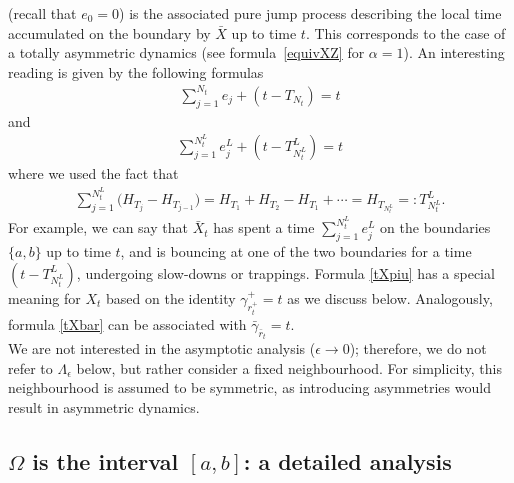 \documentclass[10pt,a4paper]{article}
\numberwithin{equation}{section}
\theoremstyle{plain}
\theoremstyle{remark}
\begin{document}
(recall that $e_0=0$) is the associated pure jump process describing the local time accumulated on the boundary by $\bar{X}$ up to time $t$. This corresponds to the case of a totally asymmetric dynamics (see formula~\eqref{equivXZ} for $\alpha=1$). An interesting reading is given by the following formulas
\begin{align}
\sum_{j=1}^{N_t}  e_j +  \left( t - T_{N_t} \right) =  t
\label{tXpiu}
\end{align}
and
\begin{align}
\sum_{j=1}^{N^L_t} e^L_j + (t - T^L_{N^L_t}) =t
\label{tXbar}
\end{align}
where we used the fact that
\begin{align*}
\sum_{j=1}^{N^L_t} \big(H_{T_j} - H_{T_{j-1}}\big) = H_{T_1} + H_{T_2} - H_{T_1} + \cdots = H_{T_{N^L_t}} =: T^L_{N^L_t}.
\end{align*}
For example, we can say that $\bar{X}_{t}$ has spent a time $\sum_{j=1}^{N^L_t} e^L_j$ on the boundaries $\{a,b\}$ up to time $t$, and is bouncing at one of the two boundaries for a time $(t - T^L_{N^L_t})$, undergoing slow-downs or trappings. Formula \eqref{tXpiu} has a special meaning for $X_t$ based on the identity $\gamma^+_{r^+_t} = t$ as we discuss below. Analogously, formula \eqref{tXbar} can be associated with $\bar{\gamma}_{\bar{r}_t} = t$.\\

We are not interested in the asymptotic analysis ($\epsilon\to 0$); therefore, we do not refer to $\Lambda_\epsilon$ below, but rather consider a fixed neighbourhood. For simplicity, this neighbourhood is assumed to be symmetric, as introducing asymmetries would result in asymmetric dynamics.


\subsection{$\Omega$ is the interval $[a,b]$: a detailed analysis}
\end{document}
